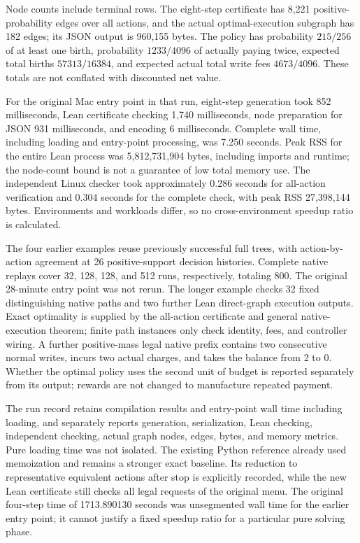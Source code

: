 \documentclass[
  english,
  11pt,
  oneside]{book}
\begin{document}
Node counts include terminal rows. The eight-step certificate has 8,221 positive-probability edges over all actions, and the actual optimal-execution subgraph has 182 edges; its JSON output is 960,155 bytes. The policy has probability \(215/256\) of at least one birth, probability \(1233/4096\) of actually paying twice, expected total births \(57313/16384\), and expected actual total write fees \(4673/4096\). These totals are not conflated with discounted net value.

For the original Mac entry point in that run, eight-step generation took 852 milliseconds, Lean certificate checking 1,740 milliseconds, node preparation for JSON 931 milliseconds, and encoding 6 milliseconds. Complete wall time, including loading and entry-point processing, was 7.250 seconds. Peak RSS for the entire Lean process was 5,812,731,904 bytes, including imports and runtime; the node-count bound is not a guarantee of low total memory use. The independent Linux checker took approximately 0.286 seconds for all-action verification and 0.304 seconds for the complete check, with peak RSS 27,398,144 bytes. Environments and workloads differ, so no cross-environment speedup ratio is calculated.

The four earlier examples reuse previously successful full trees, with action-by-action agreement at 26 positive-support decision histories. Complete native replays cover 32, 128, 128, and 512 runs, respectively, totaling 800. The original 28-minute entry point was not rerun. The longer example checks 32 fixed distinguishing native paths and two further Lean direct-graph execution outputs. Exact optimality is supplied by the all-action certificate and general native-execution theorem; finite path instances only check identity, fees, and controller wiring. A further positive-mass legal native prefix contains two consecutive normal writes, incurs two actual charges, and takes the balance from 2 to 0. Whether the optimal policy uses the second unit of budget is reported separately from its output; rewards are not changed to manufacture repeated payment.

The run record retains compilation results and entry-point wall time including loading, and separately reports generation, serialization, Lean checking, independent checking, actual graph nodes, edges, bytes, and memory metrics. Pure loading time was not isolated. The existing Python reference already used memoization and remains a stronger exact baseline. Its reduction to representative equivalent actions after stop is explicitly recorded, while the new Lean certificate still checks all legal requests of the original menu. The original four-step time of 1713.890130 seconds was unsegmented wall time for the earlier entry point; it cannot justify a fixed speedup ratio for a particular pure solving phase.
\end{document}

